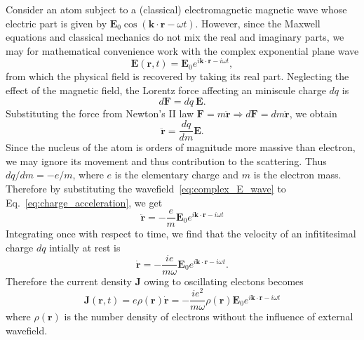 Consider an atom subject to a (classical) electromagnetic magnetic wave whose electric part is given by $\mathbf{E}_0 \cos (\mathbf{k}\cdot\mathbf{r}- \omega t)$. However, since the Maxwell equations and classical mechanics do not mix the real and imaginary parts, we may for mathematical convenience work with the complex exponential plane wave 
\begin{equation}\label{eq:complex_E_wave}
\mathbf{E}(\mathbf{r},t) = \mathbf{E}_0 e^{i \mathbf{k}\cdot\mathbf{r}-i \omega t},
\end{equation}
from which the physical field is recovered by taking its real part. Neglecting the effect of the magnetic field, the Lorentz force affecting an miniscule charge $dq$ is
\begin{equation}
d\mathbf{F} = dq \ \mathbf{E}.
\end{equation}
Substituting the force from Newton's II law $\mathbf{F} = m \ddot{\mathbf{r}} \Rightarrow d\mathbf{F} = dm \ddot{\mathbf{r}}$, we obtain
\begin{equation}\label{eq:charge_acceleration}
\ddot{\mathbf{r}} = \frac{dq}{dm} \mathbf{E}.
\end{equation}
Since the nucleus of the atom is orders of magnitude more massive than electron, we may ignore its movement and thus contribution to the scattering. Thus $dq/dm = -e/m$, where $e$ is the elementary charge and $m$ is the electron mass. Therefore by substituting the wavefield~\eqref{eq:complex_E_wave} to Eq.~\eqref{eq:charge_acceleration}, we get
\begin{equation}
\ddot{\mathbf{r}} = -\frac{e}{m} \mathbf{E}_0 e^{i \mathbf{k}\cdot\mathbf{r}-i \omega t}
\end{equation}
Integrating once with respect to time, we find that the velocity of an infititesimal charge $dq$ intially at rest is
\begin{equation}
\dot{\mathbf{r}} = -\frac{ie}{m\omega} \mathbf{E}_0 e^{i \mathbf{k}\cdot\mathbf{r}-i \omega t}.
\end{equation}
Therefore the current density $\mathbf{J}$ owing to oscillating electons becomes
\begin{equation}
\mathbf{J}(\mathbf{r},t) = e\rho(\mathbf{r})\dot{\mathbf{r}} =
-\frac{ie^2}{m\omega} \rho(\mathbf{r}) \mathbf{E}_0 e^{i \mathbf{k}\cdot\mathbf{r}-i \omega t}
\end{equation}
where $\rho(\mathbf{r})$ is the number density of electrons without the influence of external wavefield.
%
%
 
